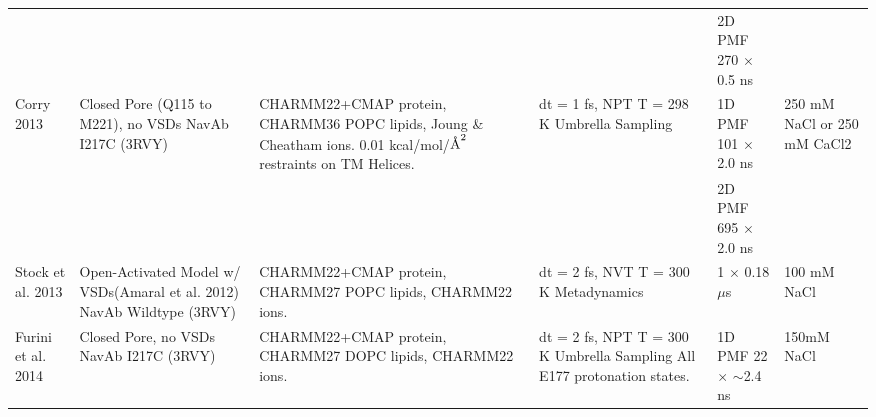 \begin{refsection}
\begin{table}[]
\begin{threeparttable}
\begin{tabular}{ | p{1.5cm} | p{2.5cm} | p{3cm} | p{3cm} | p{2cm} | p{1cm} |}
                           &                                                                            &                                                                                                                                             &                                                                             & 2D PMF 270 $\times$ 0.5 ns                                                                                                   &                                       \\
Corry 2013                 & Closed Pore (Q115 to M221), no VSDs  NavAb I217C (3RVY)\tnote{1}                   & CHARMM22+CMAP protein,\tnote{a} CHARMM36 POPC lipids,\tnote{c} Joung \& Cheatham ions.\tnote{j}  0.01 kcal/mol/$\textup{\AA}^{2}$ restraints on TM Helices. & dt = 1 fs, NPT T = 298 K  Umbrella Sampling                                 & 1D PMF 101 $\times$ 2.0 ns                                                                                                   & 250 mM NaCl   or  250 mM CaCl2        \\
                           &                                                                            &                                                                                                                                             &                                                                             & 2D PMF 695 $\times$ 2.0 ns                                                                                                   &                                       \\
Stock et al. 2013          & Open-Activated Model w/ VSDs(Amaral et al. 2012)  NavAb Wildtype (3RVY)\tnote{1}   & CHARMM22+CMAP protein,\tnote{a} CHARMM27 POPC lipids,\tnote{b} CHARMM22 ions.\tnote{d}                                                                              & dt = 2 fs, NVT T = 300 K  Metadynamics                                      & 1 $\times$ 0.18 $\mu$s                                                                                                           & 100 mM NaCl                           \\
Furini et al. 2014         & Closed Pore, no VSDs  NavAb I217C (3RVY)\tnote{1}                                  & CHARMM22+CMAP protein,\tnote{a} CHARMM27 DOPC lipids,\tnote{b} CHARMM22 ions.\tnote{d}                                                                              & dt = 2 fs, NPT T = 300 K  Umbrella Sampling  All E177 protonation states.   & 1D PMF 22 $\times$ $\sim$2.4 ns                                                                                              & 150mM NaCl                            \\

\end{tabular}
\end{threeparttable}
\end{table}
\end{refsection}
